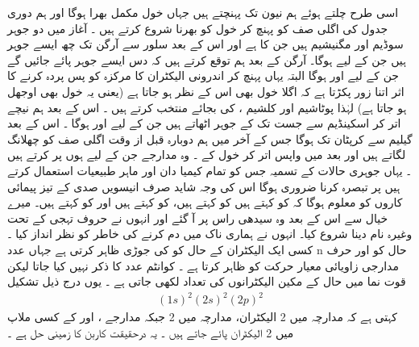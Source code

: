  
 اسی طرح چلتے ہوئے ہم  نیون     تک پہنچتے ہیں جہاں      خول مکمل بھرا ہوگا اور ہم دوری جدول کی اگلی صف کو پہنچ کر      خول کو بھرنا شروع کرتے ہیں ۔ آغاز میں دو جوہر سوڈیم اور مگنیشیم  ہیں جن کا     ہے اور اس کے بعد سلور  سے آرگن تک چھ ایسے جوہر ہیں جن کے لیے      ہوگا۔ آرگن کے بعد ہم توقع کرتے ہیں کہ دس ایسے جوہر پائے جائیں گے جن کے لیے        اور        ہوگا البتہ یہاں پہنچ کر   اندرونی الیکٹران کا مرکزہ کو پس پردہ کرنے کا اثر اتنا زور پکڑتا ہے کہ اگلا خول بھی اس کے نظر ہو جاتا ہے (یعنی یہ خول بھی  اوجھل ہو  جاتا ہے)   لہٰذا  پوٹاشیم      اور کلشیم      ،     کی بجائے    منتخب کرتے ہیں  ۔ اس کے بعد ہم نیچے اتر کر اسکینڈیم سے  جست  تک کے جوہر اٹھاتے ہیں جن کے لیے     اور     ہوگا ۔ اس کے بعد گیلیم سے کرپٹان تک      ہوگا جس کے آخر میں ہم دوبارہ قبل از وقت اگلی صف       کو چھلانگ لگاتے ہیں اور بعد میں واپس اتر کر        خول کے ۔ وہ مدارجے جن کے لیے       ہوں پر کرتے ہیں ۔ یہاں جوہری حالات کے  تسمیہ  جس کو  تمام  کیمیا دان  اور ماہر طبیعیات  استعمال کرتے ہیں پر تبصرہ کرنا ضروری ہوگا اس کی وجہ شاید صرف انیسویں صدی کے تیز پیمائی کاروں کو معلوم ہوگا کہ        کو          کہتے ہیں           کو            کہتے ہیں،           کو               کہتے ہیں اور                 کو    کہتے ہیں۔ میرے خیال سے اس کے بعد وہ سیدھی راس پر آ گئے اور انہوں نے حروف تہجی کے تحت     وغیرہ نام دینا شروع کیا۔ انہوں نے ہماری ناک میں دم کرنے کی خاطر         کو نظر انداز کیا ۔ کسی ایک الیکٹران کے حال کو           کی جوڑی ظاہر کرتی ہے جہاں عدد n حال کو اور حرف            مدارجی زاویائی معیار حرکت کو ظاہر کرتا ہے ۔ کوانٹم عدد            کا  ذکر نہیں کیا جاتا لیکن قوت نما میں حال کے مکین الیکٹرانوں کی تعداد لکھی جاتی ہے ۔ یوں درج ذیل تشکیل
\begin{align}
(1s)^{2}(2s)^{2}(2p)^{2} 
\end{align}
کہتی ہے کہ مدارچہ   میں 2 الیکٹران،  مدارچہ   میں 2 جبکہ مدارجے  ،    اور    کے کسی ملاپ میں 2 الیکٹران پائے جاتے ہیں ۔ یہ درحقیقت کاربن کا زمینی حل ہے ۔ 

